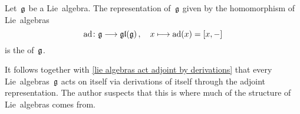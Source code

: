 \begin{definition}
	Let~$\mathfrak{g}$ be a Lie~algebra.
	The representation of~$\mathfrak{g}$ given by the homomorphism of Lie~algebras
	\[
		\ad
		\colon
		\glie
		\to
		\gllie(\glie) \,,
		\quad
		x
		\mapsto
		\ad(x)
		=
		[x,-]
	\]
	is the  of~$\mathfrak{g}$.
\end{definition}


\begin{remark}
	It follows together with \cref{lie algebras act adjoint by derivations} that every Lie~algebras~$\mathfrak{g}$ acts on itself via derivations of itself through the adjoint representation.
	The author suspects that this is where much of the structure of Lie~algebras comes from.
\end{remark}


